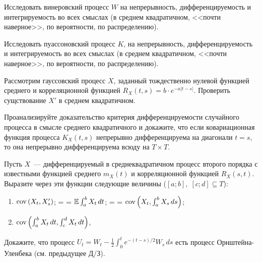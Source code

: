 \documentclass[12pt]{article}
\makeatletter
\newcommand{\inlineitem}[1][]
{%
    \ifnum\enit@type=\tw@
        {\descriptionlabel{#1}}
        \hspace{\labelsep}%
    \else
        \ifnum\enit@type=\z@
        \refstepcounter{\@listctr}\fi
        \quad\@itemlabel\hspace{\labelsep}%
\fi}
\renewcommand{\alph}[1]{\asbuk{#1}}
\def\canon{\textbf{(каноническое задание)}}
\makeatother
\begin{document}
\newpage




\begin{exercise}[subtitle={\canon}]
    Исследовать винеровский процесс $ W $ на непрерывность, дифференцируемость и интегрируемость во всех смыслах
    (в среднем квадратичном, <<почти наверное>>, по вероятности, по распределению).
\end{exercise}


\begin{exercise}[subtitle={\canon}]
    Исследовать пуассоновский процесс $ K $, на непрерывность, дифференцируемость и интегрируемость во всех смыслах
    (в среднем квадратичном, <<почти наверное>>, по вероятности, по распределению).
\end{exercise}


\begin{exercise}
    Рассмотрим гауссовский процесс $ X $,
    заданный тождественно нулевой функцией среднего и корреляционной функцией $ R_X(t, s) = b \cdot e^{-a|t - s|} $.
    Проверить сущствование $ X' $ в среднем квадратичном.
\end{exercise}


\begin{exercise}
    Проанализируйте доказательство критерия дифференцируемости случайного процесса в смысле среднего квадратичного и докажите,
    что если ковариационная функция процесса $ K_X(t, s) $ непрерывно дифференцируема на диагонали $ t = s $,
    то она непрерывно дифференцируема всюду на $ T \times T $.
\end{exercise}


\begin{exercise}
    Пусть $ X $~--- дифференцируемый в среднеквадратичном процесс второго порядка
    с известными функцией среднего $ m_X(t) $ и корреляционной функцией $ R_X(s, t) $.
    Выразите через эти функции следующие величины ($ [a; b], \; [c; d] \subseteq T $):
    \begin{enumerate}[label=\textbf{\alph*)}]
        \item
            $ \textnormal{cov}\left(X_t, X_s'\right) $;
        \inlineitem
            $ \operatorname{\mathbb{E}} \int_a^b X_t \, dt $;
        \inlineitem
            $ \textnormal{cov}\left(X_t, \int_a^b X_s \, ds\right) $;
        \item
        $ \textnormal{cov}\left(\int_a^b X_t \, dt, \int_c^d X_t \, dt\right) $,
    \end{enumerate}
\end{exercise}


\begin{exercise}
    Докажите, что процесс $ \displaystyle U_t = W_t - \frac{1}{2} \int_0^t e^{-(t - s)/2} W_s \, ds $
    есть процесс Орнштейна-Уленбека (см. предыдущее Д/З).
\end{exercise}
\end{document}
